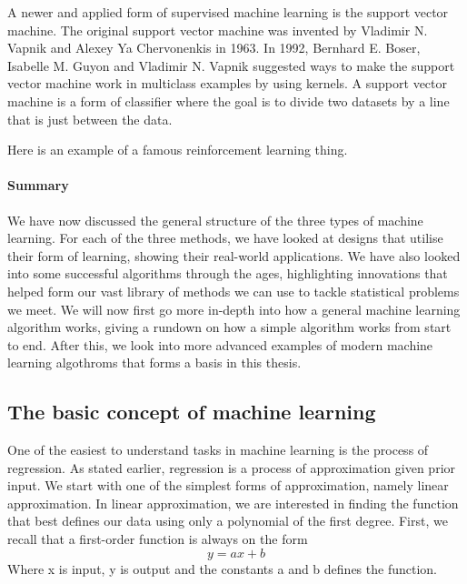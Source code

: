 \vspace{5px}

A newer and applied form of supervised machine learning is the support vector machine. The original support vector machine was invented by Vladimir N. Vapnik and Alexey Ya Chervonenkis in 1963.  
In 1992, Bernhard E. Boser, Isabelle M. Guyon and Vladimir N. Vapnik suggested ways to make the support vector machine work in multiclass examples by using kernels.  
A support vector machine is a form of classifier where the goal is to divide two datasets by a line that is just between the data. 

\vspace{5px}

Here is an example of a famous reinforcement learning thing.


\paragraph{Summary} 

We have now discussed the general structure of the three types of machine learning. For each of the three methods, we have looked at designs that utilise their form of learning, showing their real-world applications.
We have also looked into some successful algorithms through the ages, highlighting innovations that helped form our vast library of methods we can use to tackle statistical problems we meet.
We will now first go more in-depth into how a general machine learning algorithm works, giving a rundown on how a simple algorithm works from start to end.
After this, we look into more advanced examples of modern machine learning algothroms that forms a basis in this thesis.

    
\subsection{The basic concept of machine learning}   
\label{cha:concept}
One of the easiest to understand tasks in machine learning is the process of regression. As stated earlier, regression is a process of approximation given prior input.
We start with one of the simplest forms of approximation, namely linear approximation. In linear approximation, we are interested in finding the function that best defines our data using only a polynomial of the first degree.  First, we recall that a first-order function is always on the form
\begin{equation}
y = ax +b 
\end{equation}
Where x is input, y is output and the constants a and b defines the function.
    
